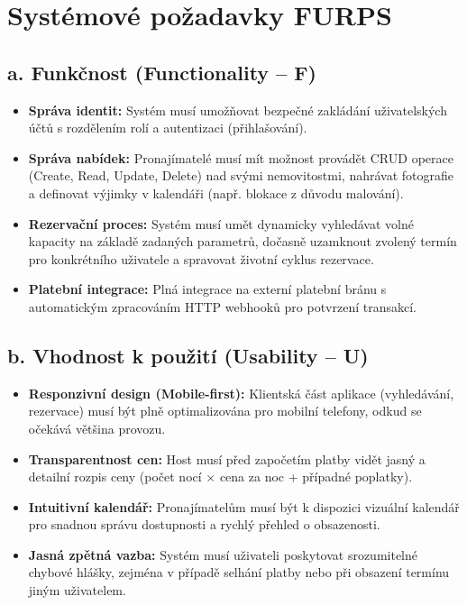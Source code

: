 \documentclass[11pt, a4paper]{article}
\begin{document}
\section{Systémové požadavky FURPS}

\subsection*{a. Funkčnost (Functionality – F)}
\begin{itemize}
    \item \textbf{Správa identit:} Systém musí umožňovat bezpečné zakládání uživatelských účtů s rozdělením rolí a autentizaci (přihlašování).
    \item \textbf{Správa nabídek:} Pronajímatelé musí mít možnost provádět CRUD operace (Create, Read, Update, Delete) nad svými nemovitostmi, nahrávat fotografie a definovat výjimky v kalendáři (např. blokace z důvodu malování).
    \item \textbf{Rezervační proces:} Systém musí umět dynamicky vyhledávat volné kapacity na základě zadaných parametrů, dočasně uzamknout zvolený termín pro konkrétního uživatele a spravovat životní cyklus rezervace.
    \item \textbf{Platební integrace:} Plná integrace na externí platební bránu s automatickým zpracováním HTTP webhooků pro potvrzení transakcí.
\end{itemize}

\subsection*{b. Vhodnost k použití (Usability – U)}
\begin{itemize}
    \item \textbf{Responzivní design (Mobile-first):} Klientská část aplikace (vyhledávání, rezervace) musí být plně optimalizována pro mobilní telefony, odkud se očekává většina provozu.
    \item \textbf{Transparentnost cen:} Host musí před započetím platby vidět jasný a detailní rozpis ceny (počet nocí $\times$ cena za noc + případné poplatky).
    \item \textbf{Intuitivní kalendář:} Pronajímatelům musí být k dispozici vizuální kalendář pro snadnou správu dostupnosti a rychlý přehled o obsazenosti.
    \item \textbf{Jasná zpětná vazba:} Systém musí uživateli poskytovat srozumitelné chybové hlášky, zejména v případě selhání platby nebo při obsazení termínu jiným uživatelem.
\end{itemize}
\end{document}
